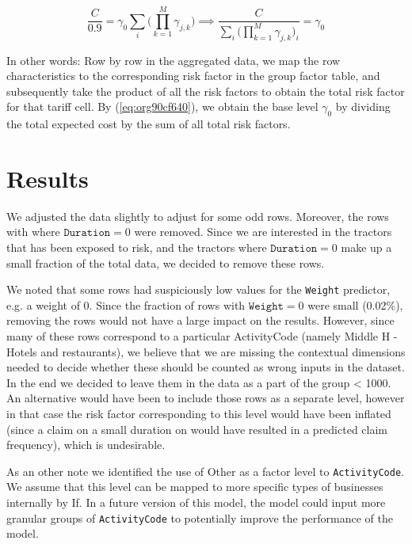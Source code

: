 \documentclass[11pt]{article}
\begin{document}
\begin{enumerate}
\begin{equation}
\label{eq:org90cf640}
\frac{C}{0.9} = \gamma_0 \sum_i \bigg ( \prod_{k = 1}^M \gamma_{j,k} \bigg) \implies \frac{C}{\sum_i \bigg ( \prod_{k = 1}^M \gamma_{j,k} \bigg)_i} = \gamma_0
\end{equation}

In other words: Row by row in the aggregated data, we map the row characteristics to the
corresponding risk factor  in the group factor table, and subsequently take the product of all 
the risk factors to obtain the total risk factor for that tariff cell. By (\ref{eq:org90cf640}), we obtain the 
base level \(\gamma_0\) by dividing the total expected cost by the sum of all total risk factors.
\end{enumerate}

\section{Results}
\label{sec:org75bcc31}

We adjusted the data slightly to adjust for some odd rows. 
Moreover, the rows with where \(\texttt{Duration} = 0\) were removed. Since we are interested in the tractors
that has been exposed to risk, and the tractors where \(\texttt{Duration} = 0\) make up a small fraction
of the total data, we decided to remove these rows. 

We noted that some rows had suspiciously low values for the \texttt{Weight} predictor, e.g. a weight of 0. 
Since the fraction of rows with \(\texttt{Weight} = 0\) were small (0.02\%), removing the rows would not have
a large impact on the results. However, since many 
of these rows correspond to a particular ActivityCode (namely Middle H - Hotels and restaurants), 
we believe that we are missing the contextual dimensions needed to decide whether these should be counted 
as wrong inputs in the dataset. In the end we decided to leave them in the data as a part of the
group < 1000. An alternative would have been to include those rows as a separate level, however in that case the risk factor
corresponding to this level would have been inflated (since a claim on a small duration on would have resulted
in a predicted claim frequency), which is undesirable.

As an other note we identified the use of Other as a factor level to \texttt{ActivityCode}. We assume that this
level can be mapped to more specific types of businesses internally by If. In a future version
of this model, the model could input more granular groups of \texttt{ActivityCode} to potentially improve 
the performance of the model.
\end{document}
